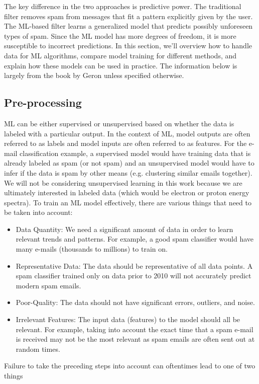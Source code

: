 The key difference in the two approaches is predictive power. The traditional filter removes spam from messages that fit a pattern explicitly given by the user. The \gls{ML}-based filter learns a generalized model that predicts possibly unforeseen types of spam. Since the \gls{ML} model has more degrees of freedom, it is more susceptible to incorrect predictions. In this section, we'll overview how to handle data for \gls{ML} algorithms, compare model training for different methods, and explain how these models can be used in practice. The information below is largely from the book by Geron \cite{Geron_2023_ML} unless specified otherwise.

\subsection{Pre-processing}
\gls{ML} can be either supervised or unsupervised based on whether the data is labeled with a particular output. In the context of \gls{ML}, model outputs are often referred to as labels and model inputs are often referred to as features. For the e-mail classification example, a supervised model would have training data that is already labeled as spam (or not spam) and an unsupervised model would have to infer if the data is spam by other means (e.g. clustering similar emails together). We will not be considering unsupervised learning in this work because we are ultimately interested in labeled data (which would be electron or proton energy spectra). To train an \gls{ML} model effectively, there are various things that need to be taken into account: 

\begin{itemize}
	\item Data Quantity: We need a significant amount of data in order to learn relevant trends and patterns. For example, a good spam classifier would have many e-mails (thousands to millions) to train on.
	\item Representative Data: The data should be representative of all data points. A spam classifier trained only on data prior to 2010 will not accurately predict modern spam emails.
	\item Poor-Quality: The data should not have significant errors, outliers, and noise. 
	\item Irrelevant Features: The input data (features) to the model should all be relevant. For example, taking into account the exact time that a spam e-mail is received may not be the most relevant as spam emails are often sent out at random times. 
\end{itemize}
Failure to take the preceding steps into account can oftentimes lead to one of two things

